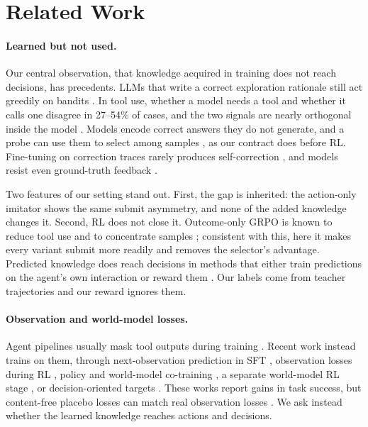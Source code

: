 \section{Related Work}
\label{sec:related}

\paragraph{Learned but not used.}
Our central observation, that knowledge acquired in training does not reach decisions, has precedents. LLMs that write a correct exploration rationale still act greedily on bandits \citep{schmied2025greedy}. In tool use, whether a model needs a tool and whether it calls one disagree in 27--54\% of cases, and the two signals are nearly orthogonal inside the model \citep{cheng2026tooluse}. Models encode correct answers they do not generate, and a probe can use them to select among samples \citep{orgad2024knowmore}, as our contract does before RL. Fine-tuning on correction traces rarely produces self-correction \citep{kumar2024score}, and models resist even ground-truth feedback \citep{jiang2025feedbackfriction}.

Two features of our setting stand out. First, the gap is inherited: the action-only imitator shows the same submit asymmetry, and none of the added knowledge changes it. Second, RL does not close it. Outcome-only GRPO is known to reduce tool use \citep{zeng2025turnlevel} and to concentrate samples \citep{yue2025rlreasoning}; consistent with this, here it makes every variant submit more readily and removes the selector's advantage. Predicted knowledge does reach decisions in methods that either train predictions on the agent's own interaction \citep{chen2025spa,zhang2025earlyexperience} or reward them \citep{wang2025vagen}. Our labels come from teacher trajectories and our reward ignores them.

\paragraph{Observation and world-model losses.}
Agent pipelines usually mask tool outputs during training \citep{jin2025searchr1}. Recent work instead trains on them, through next-observation prediction in SFT \citep{zhang2026actobs}, observation losses during RL \citep{shrivastava2026echo}, policy and world-model co-training \citep{lu2026paw,li2026tapo}, a separate world-model RL stage \citep{yu2026rwml}, or decision-oriented targets \citep{cai2026aawm}. These works report gains in task success, but content-free placebo losses can match real observation losses \citep{wang2026darkroom}. We ask instead whether the learned knowledge reaches actions and decisions.

